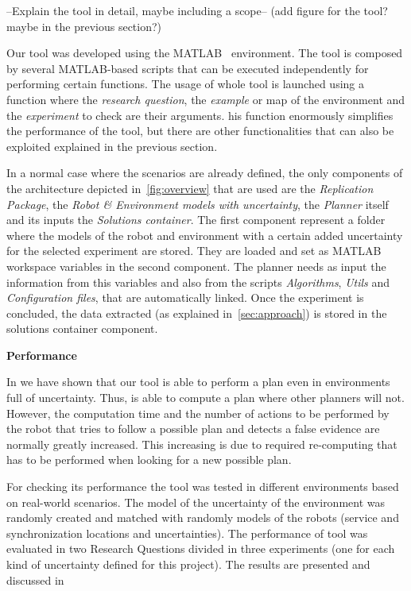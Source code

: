 --Explain the tool in detail, maybe including a scope-- (add figure for the tool? maybe in the previous section?)

Our tool was developed using the MATLAB~\cite{matlab} environment.
The tool is composed by several MATLAB-based scripts that can be executed independently for performing certain functions.
The usage of whole tool is launched using a function where the \emph{research question}, the \emph{example} or map of the environment and the \emph{experiment} to check are their arguments.
his function enormously simplifies the performance of the tool, but there are other functionalities that can also be exploited explained in the previous section.

In a normal case where the scenarios are already defined, the only components of the architecture depicted in~\ref{fig:overview} that are used are the \emph{Replication Package}, the \emph{Robot \& Environment models with uncertainty}, the \emph{Planner} itself and its inputs the \emph{Solutions container}.
The first component represent a folder where the models of the robot and environment with a certain added uncertainty for the selected experiment are stored.
They are loaded and set as MATLAB workspace variables in the second component.
The planner needs as input the information from this variables and also from the scripts \emph{Algorithms}, \emph{Utils} and \emph{Configuration files}, that are automatically linked.
Once the experiment is concluded, the data extracted (as explained in~\ref{sec:approach}) is stored in the solutions container component.


\textbf{Performance}

In  we have shown that our tool is able to perform a plan even in environments full of uncertainty.
Thus, \toolName is able to compute a plan where other planners will not.
However, the computation time and the number of actions to be performed by the robot that tries to follow a possible plan and detects a false evidence are normally greatly increased.
This increasing is due to required re-computing that has to be performed when looking for a new possible plan.

For checking its performance the tool was tested in different environments based on real-world scenarios.
The model of the uncertainty of the environment was randomly created and matched with randomly models of the robots (service and synchronization locations and uncertainties).
The performance of tool was evaluated in two Research Questions divided in three experiments (one for each kind of uncertainty defined for this project).
The results are presented and discussed in 

